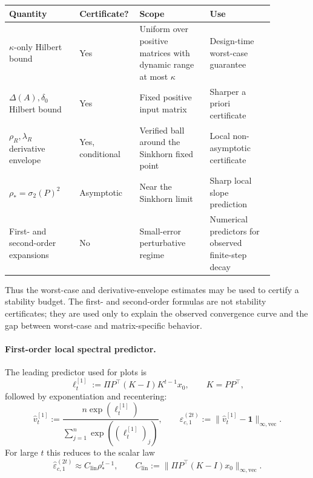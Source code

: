 \documentclass[11pt]{article}
\numberwithin{equation}{section}
\theoremstyle{plain}
\theoremstyle{definition}
\theoremstyle{remark}
\newcommand{\ones}{\mathbf{1}}
\begin{document}
\begin{center}
\scriptsize
\setlength{\tabcolsep}{3pt}
\begin{tabular}{p{0.25\linewidth}p{0.14\linewidth}p{0.25\linewidth}p{0.23\linewidth}}
\toprule
Quantity & Certificate? & Scope & Use \\
\midrule
\(\kappa\)-only Hilbert bound
& Yes
& Uniform over positive matrices with dynamic range at most \(\kappa\)
& Design-time worst-case guarantee \\
\(\Delta(A),\delta_0\) Hilbert bound
& Yes
& Fixed positive input matrix
& Sharper a priori certificate \\
\(\rho_R,\lambda_R\) derivative envelope
& Yes, conditional
& Verified ball around the Sinkhorn fixed point
& Local non-asymptotic certificate \\
\(\rho_*=\sigma_2(P)^2\)
& Asymptotic
& Near the Sinkhorn limit
& Sharp local slope prediction \\
First- and second-order expansions
& No
& Small-error perturbative regime
& Numerical predictors for observed finite-step decay \\
\bottomrule
\end{tabular}
\end{center}

Thus the worst-case and derivative-envelope estimates may be used to certify a
stability budget.  The first- and second-order formulas are not stability
certificates; they are used only to explain the observed convergence curve and
the gap between worst-case and matrix-specific behavior.

\paragraph{First-order local spectral predictor.}
The leading predictor used for plots is
\begin{equation}\label{eq:local-spectral-predictor}
        \ell_t^{[1]}
        :=
        \Pi P^\top(K-I)K^{t-1}x_0,
        \qquad
        K=PP^\top,
\end{equation}
followed by exponentiation and recentering:
\begin{equation}\label{eq:local-spectral-predicted-error}
        \widehat v_t^{[1]}
        :=
        \frac{n\exp(\ell_t^{[1]})}{\sum_{j=1}^n \exp((\ell_t^{[1]})_j)},
        \qquad
        \widehat\varepsilon_{c,1}^{(2t)}
        :=
        \|\widehat v_t^{[1]}-\ones\|_{\infty,\mathrm{vec}}.
\end{equation}
For large $t$ this reduces to the scalar law
\[
        \widehat\varepsilon_{c,1}^{(2t)}
        \approx
        C_{\mathrm{lin}}\rho_*^{t-1},
        \qquad
        C_{\mathrm{lin}}:=\|\Pi P^\top(K-I)x_0\|_{\infty,\mathrm{vec}}.
\]
\end{document}
